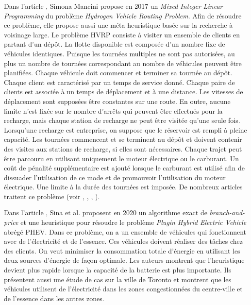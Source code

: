 Dans l'article \cite{article_HVRP1}, Simona Mancini propose en 2017 un \textit{Mixed Integer Linear Programming
} du problème \textit{Hydrogen Vehicle Routing Problem}. Afin de résoudre ce problème, elle propose aussi une méta-heuristique basée sur la recherche à voisinage large.
Le problème HVRP consiste à visiter un ensemble de clients en partant d'un dépôt. La flotte disponible est composée d'un nombre fixe de véhicules identiques. Puisque les tournées multiples ne sont pas autorisées, au plus un nombre de tournées correspondant au nombre de véhicules peuvent être planifiées. Chaque véhicule doit commencer et terminer sa tournée au dépôt. Chaque client est caractérisé par un temps de service donné. Chaque paire de clients est associée à un temps de déplacement et à une distance. Les vitesses de déplacement
sont supposées être constantes sur une route. En outre, aucune limite n'est fixée sur le nombre d'arrêts qui peuvent être effectués pour la recharge, mais chaque station de recharge ne peut être visitée qu'une seule fois. Lorsqu'une recharge est entreprise, on suppose que le réservoir est rempli à pleine capacité. Les tournées commencent et se terminent au dépôt et doivent contenir des visites aux stations de recharge, si elles sont nécessaires. Chaque trajet peut être parcouru en utilisant uniquement le moteur électrique ou le carburant. Un coût de pénalité supplémentaire est ajouté lorsque le carburant est utilisé afin de dissuader l'utilisation de ce mode et de promouvoir l'utilisation du moteur électrique. Une limite à la durée des tournées est imposée. De nombreux articles traitent ce problème (voir \cite{EVRP_Sina_2020} \cite{article_HVRP2}, \cite{article_HVRP1},  \cite{article_HVRP5}, \cite{article_HVRP3}).

Dans l'article \cite{EVRP_Sina_2020}, Sina et al. proposent en 2020 un algorithme exact de \textit{branch-and-price} et une heuristique pour résoudre le problème \textit{Plugin Hybrid Electric Vehicle} abrégé PHEV. Dans ce problème, on a un ensemble de véhicules qui fonctionnent avec de l'électricité et de l'essence. Ces véhicules doivent réaliser des tâches chez des clients. On veut minimiser la consommation totale d'énergie en utilisant les deux sources d'énergie de façon optimale. Les auteurs montrent que l'heuristique devient plus rapide lorsque la capacité de la batterie est plus importante. Ils présentent aussi une étude de cas sur la ville de Toronto et montrent que les véhicules utilisent de l'électricité dans les zones congestionnées du centre-ville et de l'essence dans les autres zones.

